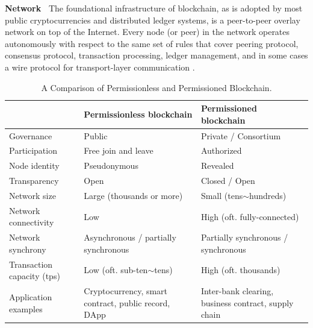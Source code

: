 \label{subsec:block-infra}
\textbf{Network~} 
The foundational infrastructure of blockchain, as is adopted by most public cryptocurrencies and distributed ledger systems, is a peer-to-peer overlay network on top of the Internet. 
Every node (or peer) in the network operates autonomously with respect to the same set of rules that cover peering protocol, consensus protocol, transaction processing, ledger management, and in some cases a wire protocol for transport-layer communication . 
\begin{table}
    \centering
    \color{\rcolor}
    \caption{A Comparison of Permissionless and Permissioned Blockchain.}
    \renewcommand{\arraystretch}{1.2}
    \small
    \begin{tabular} {|p{0.7in}||p{1.1in}|p{1.1in}|}
        \hline
        & \textbf{Permissionless blockchain} & \textbf{Permissioned blockchain} \\ \hline \hline
        Governance & Public & Private / Consortium \\ \hline
        Participation & Free join and leave & Authorized \\ \hline
        Node identity & Pseudonymous & Revealed \\ \hline
        Transparency & Open & Closed / Open \\ \hline
        Network \hspace{1in} size & Large \hspace{1in} (thousands or more) & Small (tens$\sim$hundreds) \\ \hline
        Network \hspace{1in} connectivity & Low & High \hspace{1in} (oft. fully-connected) \\ \hline
        Network \hspace{1in} synchrony & Asynchronous / partially synchronous & Partially synchronous / synchronous \\ \hline
        Transaction capacity (tps) & Low \hspace{1in} (oft. sub-ten$\sim$tens) & High \hspace{1in} (oft. thousands) \\ \hline
        Application examples & Cryptocurrency, smart contract, public record, DApp & Inter-bank clearing, business contract, supply chain  \\ \hline
    \end{tabular}
    \renewcommand{\arraystretch}{1}
    \label{tab:permissionless-v-permissioned}
\end{table}
